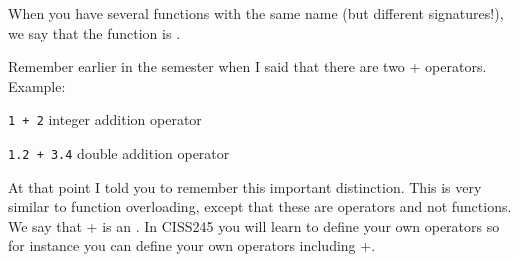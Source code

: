 When you have several functions with the same name (but different signatures!), we say that the function is .




Remember earlier in the semester when I said that there are two + operators. Example:

\verb!1 + 2! integer addition operator

\verb!1.2 + 3.4! double addition operator

At that point I told you to remember this important distinction. This is very similar to function overloading, except that these are operators and not functions. We say that + is an . In CISS245 you will learn to define your own operators so for instance you can define your own operators including +.


